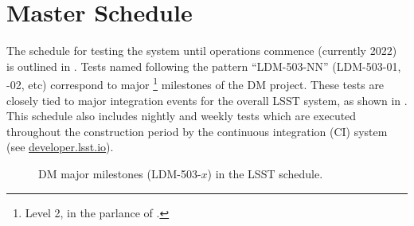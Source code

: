\section{Master Schedule\label{sect:schedule}}

The schedule for testing the system until operations commence (currently 2022) is outlined in .
Tests named following the pattern ``LDM-503-NN'' (LDM-503-01, -02, etc) correspond to major \footnote{Level 2, in the parlance of .} milestones of the DM project.
These tests are closely tied to major integration events for the overall LSST system, as shown in .
This schedule also includes nightly and weekly tests which are executed throughout the construction period by the continuous integration (CI) system (see \url{developer.lsst.io}).



\begin{figure}[htbp]
\begin{center}

\end{center}
	\caption{DM major milestones (LDM-503-$x$) in the LSST schedule.\label{fig:schedule}}
\end{figure}


